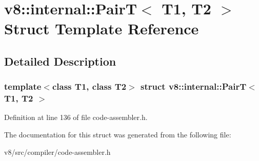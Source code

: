 \hypertarget{structv8_1_1internal_1_1PairT}{}\section{v8\+:\+:internal\+:\+:PairT$<$ T1, T2 $>$ Struct Template Reference}
\label{structv8_1_1internal_1_1PairT}


\subsection{Detailed Description}
\subsubsection*{template$<$class T1, class T2$>$\newline
struct v8\+::internal\+::\+Pair\+T$<$ T1, T2 $>$}



Definition at line 136 of file code-\/assembler.\+h.



The documentation for this struct was generated from the following file\+:\begin{DoxyCompactItemize}
\item 
v8/src/compiler/code-\/assembler.\+h\end{DoxyCompactItemize}
